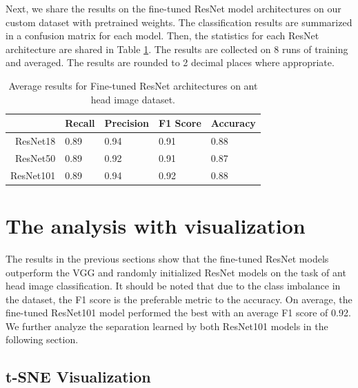 \documentclass{aci}
\numberwithin{equation}{section}
\begin{document}
Next, we share the results on the fine-tuned ResNet model architectures on our
custom dataset with pretrained weights. The classification results are
summarized in a confusion matrix for each model. Then, the statistics for each
ResNet architecture are shared in Table \ref{tab:fresnet_results}. The results
are collected on 8 runs of training and averaged. The results are rounded
to 2 decimal places where appropriate.

\begin{table}[h]
    \centering
    \caption{Average results for Fine-tuned ResNet architectures on ant head image dataset.}
    \begin{tabular}{r|llll}
                  & Recall & Precision & F1 Score & Accuracy \\
        \hline
        ResNet18  & 0.89   & 0.94      & 0.91     & 0.88     \\
        ResNet50  & 0.89   & 0.92      & 0.91     & 0.87     \\
        ResNet101 & 0.89   & 0.94      & 0.92     & 0.88     \\
    \end{tabular}
    \label{tab:fresnet_results}
\end{table}

\section{The analysis with visualization}

The results in the previous sections show that the fine-tuned ResNet models
outperform the VGG and randomly initialized ResNet models on the task of ant
head image classification. It should be noted that due to the class imbalance in
the dataset, the F1 score is the preferable metric to the accuracy. On average,
the fine-tuned ResNet101 model performed the best with an average F1 score of
0.92. We further analyze the separation learned by both ResNet101 models in the
following section.

\subsection{t-SNE Visualization}
\end{document}
